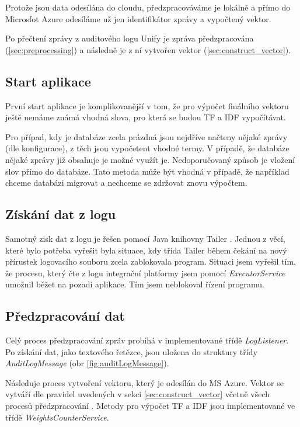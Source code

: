 \documentclass[thesis=M,czech]{FITthesis}[2012/10/20]
\begin{document}
		Protože jsou data odesílána do cloudu, předzpracováváme je lokálně a přímo do Microsfot Azure odesíláme už jen identifikátor zprávy a vypočtený vektor.
		
		Po přečtení zprávy z auditového logu Unify je zpráva předzpracována (\ref{sec:preprocessing}) a následně je z ní vytvořen vektor (\ref{sec:construct_vector}).
		
		\subsection{Start aplikace}
			První start aplikace je komplikovanější v tom, že pro výpočet finálního vektoru ještě nemáme známá vhodná slova, pro která se budou TF a IDF vypočítávat.
			
			Pro případ, kdy je databáze zcela prázdná jsou nejdříve načteny nějaké zprávy (dle konfigurace), z těch jsou vypočetent vhodné termy.
			V případě, že databáze nějaké zprávy již obsahuje je možné využít je. Nedoporučovaný způsob je vložení slov přímo do databáze. Tato metoda může být vhodná v případě, že například chceme databázi migrovat a nechceme se zdržovat znovu výpočtem.
		
		\subsection{Získání dat z logu}
		 Samotný zisk dat z logu je řešen pomocí Java knihovny Tailer \cite{javaTailer}. Jednou z věcí, které bylo potřeba vyřešit byla situace, kdy třída Tailer během čekání na nový přírustek logovacího souboru zcela zablokovala program. Situaci jsem vyřešil tím, že procesu, který čte z logu integrační platformy jsem pomocí \textit{ExecutorService} \cite{javaExecutorService} umožnil běžet na pozadí aplikace. Tím jsem neblokoval řízení programu.
		 
		\subsection{Předzpracování dat}
		Celý proces předzpracování zpráv probíhá v implementované třídě \textit{LogListener}. Po získání dat, jako textového řetězce, jsou uložena do struktury třídy \textit{AuditLogMessage} (obr \ref{fig:auditLogMessage}). 
		
		Následuje proces vytvoření vektoru, který je odesílán do MS Azure. Vektor se vytváří dle pravidel uvedených v sekci \ref{sec:construct_vector} včetně všech procesů předzpracování . Metody pro výpočet TF a IDF jsou implementované ve třídě \textit{WeightsCounterService}.  
		
\end{document}
